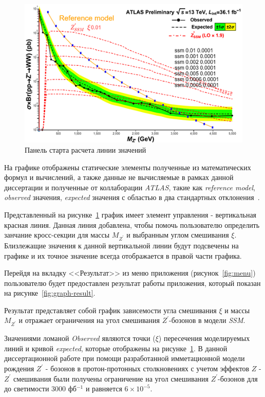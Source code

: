 \begin{figure}[!h]
	\centering
	\includegraphics[width=\textwidth]{figures/graph-1.png}
	\caption{Панель старта расчета линии значений}
	\label{fig:graph-1}
\end{figure}

На графике отображены статические элементы полученные из математических формул и вычислений, а также данные не вычисляемые в рамках данной диссертации и полученные от коллаборации \textit{ATLAS}, такие  как \textit{reference model}, \textit{observed} значения, \textit{expected} значения с областью в два стандартных отклонения~\cite{2part-pankov}.

Представленный на рисунке~\ref{fig:graph-1} график имеет элемент управления - вертикальная красная линия. Данная линия добавлена, чтобы помочь пользователю определить занчание кросс-секции для массы ${M}_{{Z}^{\prime}}$ и выбранным углом смешивания $\xi$. Близлежащие значения к данной вертикальной линии будут подсвечены на графике и их точное значение всегда отображается в правой части графика.

Перейдя на вкладку <<Результат>> из меню приложения (рисунок~\ref{fig:menu}) пользователю будет предоставлен результат работы приложения, который показан на рисунке~\ref{fig:graph-result}.

Результат представляет собой график зависемости угла смешивания $\xi$ и массы ${M}_{{Z}^{\prime}}$ и отражает ограничения на угол смешивания ${Z}^{\prime}$-бозонов в модели \textit{SSM}. 

Значениями ломаной \textit{Observed} являются точки ($\xi$) пересечения моделируемых линий и кривой \textit{expected}, которые отображены на рисунке~\ref{fig:graph-1}. В данной диссертационной работе при помощи разработанной имметационной модели рождения $Z^\prime$ - бозонов в протон-протонных столкновениях с учетом эффектов $Z$ - $Z^\prime$ смешивания были получены ограничение на угол смешивания ${Z}^{\prime}$-бозонов для до светимости 3000 фб${}^{−1}$ и равняется $6\times{10}^{-5}$.

